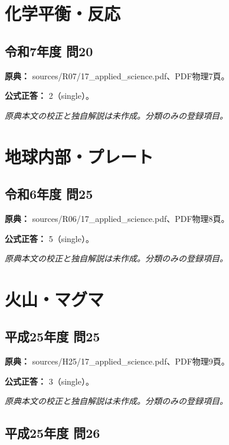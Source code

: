 \section{化学平衡・反応}

\subsection{令和7年度 問20}
\label{q:r07-reg-applied-20}

\noindent\textbf{原典：} sources/R07/17\_applied\_science.pdf、PDF物理7頁。

\textbf{公式正答：} 2（single）。

\par\textit{原典本文の校正と独自解説は未作成。分類のみの登録項目。}

\section{地球内部・プレート}

\subsection{令和6年度 問25}
\label{q:r06-reg-applied-25}

\noindent\textbf{原典：} sources/R06/17\_applied\_science.pdf、PDF物理8頁。

\textbf{公式正答：} 5（single）。

\par\textit{原典本文の校正と独自解説は未作成。分類のみの登録項目。}

\section{火山・マグマ}

\subsection{平成25年度 問25}
\label{q:h25-reg-applied-25}

\noindent\textbf{原典：} sources/H25/17\_applied\_science.pdf、PDF物理9頁。

\textbf{公式正答：} 3（single）。

\par\textit{原典本文の校正と独自解説は未作成。分類のみの登録項目。}

\subsection{平成25年度 問26}
\label{q:h25-reg-applied-26}

